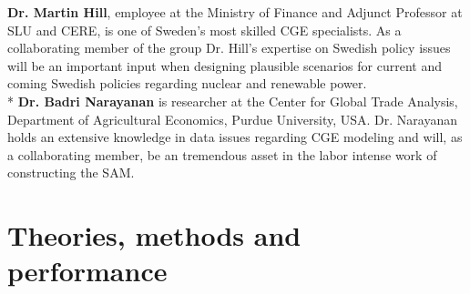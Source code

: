 \textbf{Dr. Martin Hill}, employee at the Ministry of Finance and Adjunct Professor at SLU and CERE, is one of Sweden's most skilled CGE specialists. As a collaborating member of the group Dr. Hill’s expertise on Swedish policy issues will be an important input when designing plausible scenarios for current and coming Swedish policies regarding nuclear and renewable power.\\*
\textbf{Dr. Badri Narayanan} is researcher at the Center for Global Trade Analysis, Department of Agricultural Economics, Purdue University, USA. Dr. Narayanan holds an extensive knowledge in data issues regarding CGE modeling and will, as a collaborating member, be an tremendous asset in the labor intense work of constructing the SAM.

\section{Theories, methods and performance}
\begin{comment}
	2 Method and performance
		• Feasibility and adequacy of scientific methods  
		• Innovativeness and boldness of methodology  
		• Concrete and realistic work plan  
		• Concrete and realistic plan for scientific deliverables  
		• Coordination of project and research group  
		• Suitability of multi- and interdisciplinary approaches  
		• Ethical considerations
		Clarifications:  
		• Feasibility and adequacy of scientific approaches and methods should receive primary
			consideration
	3 Scientific competence
		• Quality of scientific publications  
		• Ability to carry out the project according to plan 
		• Adequate experience of project management  
		• National and international activities, including projects, networks, assignments,
			commissions of trust, and participating at or arranging workshops or conferences  
		• Strength and competitiveness of the research team  
		Clarifications:  
		• Quality of scientific publications should be assessed taking into account the
			standards within each scientific field 
		• When several researchers collaborate, assessment of scientific competence is made
			both of each researcher separately and of the research group collectively  
		• For starting mobility grants, strength and competitiveness of the research environment
			should be assessed for the home university and the host university 
\end{comment}

